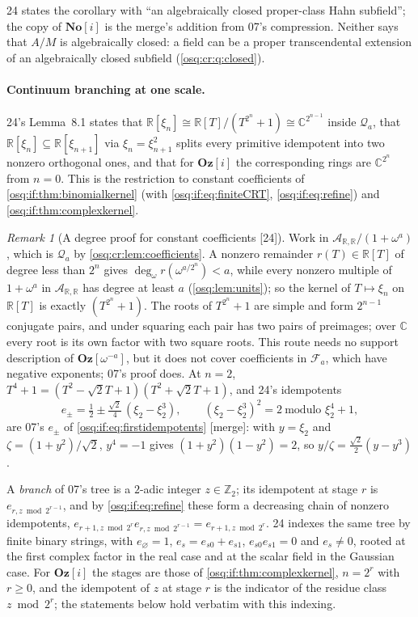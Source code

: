 \documentclass[11pt,letterpaper]{article}
\numberwithin{equation}{section}
\theoremstyle{definition}
\theoremstyle{remark}
\newtheorem{remark}[remark]{Remark}
\theoremstyle{plain}
\newcommand{\No}{\mathbf{No}}
\newcommand{\Oz}{\mathbf{Oz}}
\newcommand{\SC}{\No[i]}
\newcommand{\GOz}{\Oz[i]}
\newcommand{\Z}{\mathbb Z}
\newcommand{\R}{\mathbb R}
\newcommand{\C}{\mathbb C}
\newcommand{\A}{\mathcal A}          %
\newcommand{\FF}{\mathscr F}         %
\newcommand{\Qa}{\mathcal Q}         %
\newcommand{\degw}{\deg_{\omega}}
\newcommand{\src}[1]{\textup{\textsf{[#1]}}}
\newcommand{\merge}{\textup{\textsf{[merge]}}}
\begin{document}
24 states the corollary with ``an algebraically closed proper-class Hahn subfield''; the copy of $\SC$ is the merge's addition from 07's compression.
Neither says that $A/M$ is algebraically closed: a field can be a proper transcendental extension of an algebraically closed subfield
(\cref{osq:cr:q:closed}).

\paragraph{Continuum branching at one scale.} 24's Lemma~8.1 states that $\R[\xi_n]\cong\R[T]/(T^{2^n}+1)\cong\C^{2^{n-1}}$ inside $\Qa_a$, that
$\R[\xi_n]\subseteq\R[\xi_{n+1}]$ via $\xi_n=\xi_{n+1}^2$ splits every primitive idempotent into two nonzero orthogonal ones, and that for $\GOz$ the
corresponding rings are $\C^{2^n}$ from $n=0$. This is the restriction to constant coefficients of \cref{osq:if:thm:binomialkernel} (with
\eqref{osq:if:eq:finiteCRT}, \eqref{osq:if:eq:refine}) and \cref{osq:if:thm:complexkernel}.

\begin{remark}[A degree proof for constant coefficients \src{24}]\label{osq:cr:rem:dyadic}
Work in $\A_{\R,\R}/(1+\omega^a)$, which is $\Qa_a$ by \cref{osq:cr:lem:coefficients}. A nonzero remainder $r(T)\in\R[T]$ of degree less than $2^n$ gives
$\degw r(\omega^{a/2^n})<a$, while every nonzero multiple of $1+\omega^a$ in $\A_{\R,\R}$ has degree at least $a$ (\cref{osq:lem:units}); so the kernel of
$T\mapsto\xi_n$ on $\R[T]$ is exactly $(T^{2^n}+1)$. The roots of $T^{2^n}+1$ are simple and form $2^{n-1}$ conjugate pairs, and under squaring each pair
has two pairs of preimages; over $\C$ every root is its own factor with two square roots. This route needs no support description of
$\Oz[\omega^{-a}]$, but it does not cover coefficients in $\FF_a$, which have negative exponents; 07's proof does. At $n=2$, $T^4+1=(T^2-\sqrt2T+1)
(T^2+\sqrt2T+1)$, and 24's idempotents
\[
 e_\pm=\tfrac12\pm\tfrac{\sqrt2}{4}\,(\xi_2-\xi_2^3),\qquad (\xi_2-\xi_2^3)^2=2\ \text{modulo }\xi_2^4+1,
\]
are 07's $e_\pm$ of \eqref{osq:if:eq:firstidempotents} \merge: with $y=\xi_2$ and $\zeta=(1+y^2)/\sqrt2$, $y^4=-1$ gives $(1+y^2)(1-y^2)=2$, so
$y/\zeta=\frac{\sqrt2}2(y-y^3)$.
\end{remark}

A \emph{branch} of 07's tree is a $2$-adic integer $z\in\Z_2$; its idempotent at stage $r$ is $e_{r,z\bmod 2^{r-1}}$, and by \eqref{osq:if:eq:refine}
these form a decreasing chain of nonzero idempotents, $e_{r+1,z\bmod2^r}e_{r,z\bmod2^{r-1}}=e_{r+1,z\bmod2^r}$. 24 indexes the same tree by finite
binary strings, with $e_\varnothing=1$, $e_s=e_{s0}+e_{s1}$, $e_{s0}e_{s1}=0$ and $e_s\ne0$, rooted at the first complex factor in the real case and at the
scalar field in the Gaussian case. For $\GOz$ the stages are those of \cref{osq:if:thm:complexkernel}, $n=2^r$ with $r\ge0$, and the idempotent of $z$
at stage $r$ is the indicator of the residue class $z\bmod2^r$; the statements below hold verbatim with this indexing.
\end{document}
